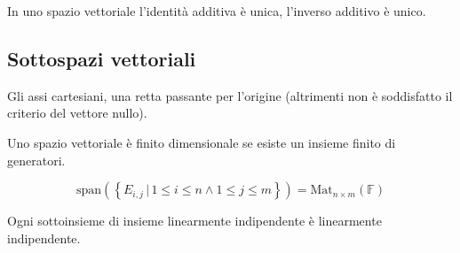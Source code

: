 \documentclass[a4paper]{article}
\begin{document}
In uno spazio vettoriale l'identità additiva è unica, l'inverso additivo è unico.

\subsection{Sottospazi vettoriali}

Gli assi cartesiani, una retta passante per l'origine (altrimenti non è soddisfatto il criterio del vettore nullo).


Uno spazio vettoriale è finito dimensionale se esiste un insieme finito di generatori.

\[
    \text{span}\left(
        \left\{
            E_{i,j} \,|\, 1 \leq i \leq n \land 1 \leq j \leq m
        \right\}
    \right)
    = \text{Mat}_{n\times m}(\mathbb{F})
\]

Ogni sottoinsieme di insieme linearmente indipendente è linearmente indipendente.

\sproposition{}{
    \[
        \text{Sym}(n) \oplus \text{Skew}(n) = M_{n\times n}(\mathbb{F})
    \]
}
\end{document}
